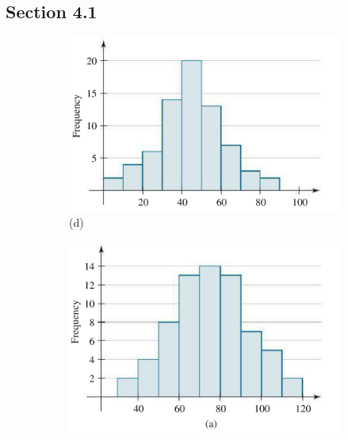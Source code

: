 \documentclass[12pt]{scrartcl}
\theoremstyle{definition}
\begin{document}
\subsection*{Section 4.1}
\begin{figure}[h!]
\centering
\begin{subfigure}{.5\textwidth}
  \centering
  \includegraphics[scale=0.45]{RevSec411}
  \caption*{(d)}
\end{subfigure}%
\begin{subfigure}{.5\textwidth}
  \centering
  \includegraphics[scale=0.45]{RevSec412}
\end{subfigure}
\end{figure}
\end{document}
